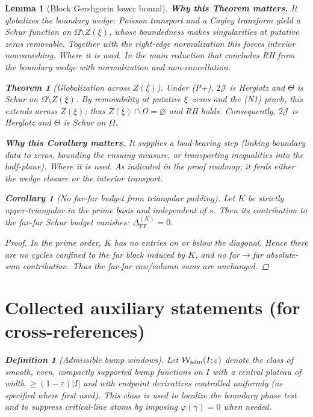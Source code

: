 \documentclass[11pt]{article}
\newtheorem{theorem}{Theorem}[section]
\newtheorem{lemma}{Lemma}[section]
\newtheorem{corollary}{Corollary}[section]
\theoremstyle{definition}
\newtheorem{definition}{Definition}[section]
\theoremstyle{remark}
\begin{document}
\begin{lemma}[Block Gershgorin lower bound]
\vspace{1.0cm}
\noindent\textbf{Why this Theorem matters.} It globalizes the boundary wedge: Poisson transport and a Cayley transform yield a Schur function on $\Omega\setminus Z(\xi)$, whose boundedness makes singularities at putative zeros removable. Together with the right-edge normalization this forces interior nonvanishing.
\noindent\textit{Where it is used.} In the main reduction that concludes RH from the boundary wedge with normalization and non-cancellation.
\begin{theorem}[Globalization across $Z(\xi)$]\label{thm:globalize-main}
Under (P+), $2\mathcal J$ is Herglotz and $\Theta$ is Schur on $\Omega\setminus Z(\xi)$. By removability at putative $\xi$--zeros and the (N1) pinch, this extends across $Z(\xi)$; thus $Z(\xi)\cap\Omega=\varnothing$ and RH holds. Consequently, $2\mathcal J$ is Herglotz and $\Theta$ is Schur on $\Omega$.
\end{theorem}





\vspace{1.0cm}
\noindent\textbf{Why this Corollary matters.} It supplies a load-bearing step (linking boundary data to zeros, bounding the ensuing measure, or transporting inequalities into the half-plane).
\noindent\textit{Where it is used.} As indicated in the proof roadmap; it feeds either the wedge closure or the interior transport.
\begin{corollary}[No far-far budget from triangular padding]\label{cor:K-no-FF}
Let $K$ be strictly upper-triangular in the prime basis and independent of $s$. Then its contribution to the far-far Schur budget vanishes: $\Delta_{\mathrm{FF}}^{(K)}=0$.
\end{corollary}
\begin{proof}
In the prime order, $K$ has no entries on or below the diagonal. Hence there are no cycles confined to the far block induced by $K$, and no far$\to$far absolute-sum contribution. Thus the far-far row/column sums are unchanged.
\end{proof}
% 
\section*{Collected auxiliary statements (for cross-references)}

\begin{definition}[Admissible bump windows]\label{def:adm-bumps}
Let $\mathcal W_{\rm adm}(I;\varepsilon)$ denote the class of smooth, even, compactly supported bump functions on $I$ with a central plateau of width $\ge (1-\varepsilon)|I|$ and with endpoint derivatives controlled uniformly (as specified where first used). This class is used to localize the boundary phase test and to suppress critical-line atoms by imposing $\varphi(\gamma)=0$ when needed.
\end{definition}


\end{lemma}
\end{document}
